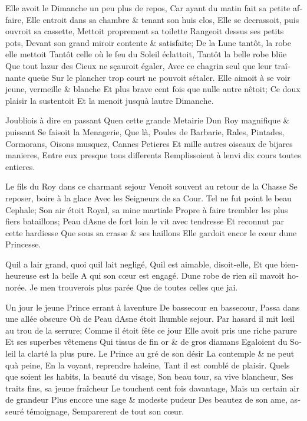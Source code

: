 \documentclass[14pt,a4paper]{memoir}
\begin{document}
\begin{otherlanguage}{french}
{Elle avoit le Dimanche un peu plus de repos,} {Car ayant du matin fait
sa petite affaire,} {Elle entroit dans sa chambre \& tenant son huis
clos,} {Elle se decrassoit, puis ouvroit sa cassette,} {Mettoit
proprement sa toilette} {Rangeoit dessus ses petits pots,} {Devant son
grand miroir contente \& satisfaite;} {De la Lune tantôt, la robe elle
mettoit} {Tantôt celle où le feu du Soleil éclattoit,} {Tantôt la belle
robe blüe} {Que tout l\textquotesingle azur des Cieux ne sçauroit
égaler,} {Avec ce chagrin seul que leur traînante queüe} {Sur le
plancher trop court ne pouvoit s\textquotesingle étaler. } {Elle aimoit
à se voir jeune, vermeille \& blanche} {Et plus brave cent fois que
nulle autre n\textquotesingle êtoit; } {Ce doux plaisir la sustentoit}
{Et la menoit jusqu\textquotesingle à l\textquotesingle autre Dimanche.}

{J\textquotesingle oubliois à dire en passant} {Qu\textquotesingle en
cette grande Metairie} {D\textquotesingle un Roy magnifique \& puissant}
{Se faisoit la Menagerie,} {Que là, Poules de Barbarie,} {Rales,
Pintades, Cormorans,} {Oisons musquez, Cannes Petieres} {Et mille autres
oiseaux de bijares manieres,} {Entre eux presque tous differents}
{Remplissoient à l\textquotesingle envi dix cours toutes entieres. }

{Le fils du Roy dans ce charmant sejour} {Venoit souvent au retour de la
Chasse} {Se reposer, boire à la glace} {Avec les Seigneurs de sa Cour.}
{Tel ne fut point le beau Cephale;} {Son air étoit Royal, sa mine
martiale} {Propre à faire trembler les plus fiers bataillons;} {Peau
d\textquotesingle Asne de fort loin le vit avec tendresse} {Et reconnut
par cette hardiesse} {Que sous sa crasse \& ses haillons} {Elle gardoit
encor le cœur d\textquotesingle une Princesse. }

{Qu\textquotesingle il a l\textquotesingle air grand, quoi
qu\textquotesingle il l\textquotesingle ait negligé,}
{Qu\textquotesingle il est aimable, disoit-elle,} {Et que bienheureuse
est la belle} {A qui son cœur est engagé.} {D\textquotesingle une robe
de rien s\textquotesingle il m\textquotesingle avoit honorée.} {Je
m\textquotesingle en trouverois plus parée} {Que de toutes celles que
j\textquotesingle ai.}

{Un jour le jeune Prince errant à l\textquotesingle aventure} {De
bassecour en bassecour,} {Passa dans une allée obscure} {Où de Peau
d\textquotesingle Asne étoit l\textquotesingle humble sejour.} {Par
hasard il mit l\textquotesingle œil au trou de la serrure;} {Comme il
étoit fête ce jour} {Elle avoit pris une riche parure} {Et ses superbes
vêtemens} {Qui tissus de fin or \& de gros diamans} {Egaloient du Soleil
la clarté la plus pure.} {Le Prince au gré de son désir} {La contemple
\& ne peut qu\textquotesingle à peine,} {En la voyant, reprendre
haleine,} {Tant il est comblé de plaisir.} {Quels que soient les habits,
la beauté du visage, } {Son beau tour, sa vive blancheur,} {Ses traits
fins, sa jeune fraîcheur} {Le touchent cent fois davantage,} {Mais un
certain air de grandeur} {Plus encore une sage \& modeste pudeur} {Des
beautez de son ame, asseuré témoignage,} {S\textquotesingle emparerent
de tout son cœur.}


\end{otherlanguage}
\end{document}
